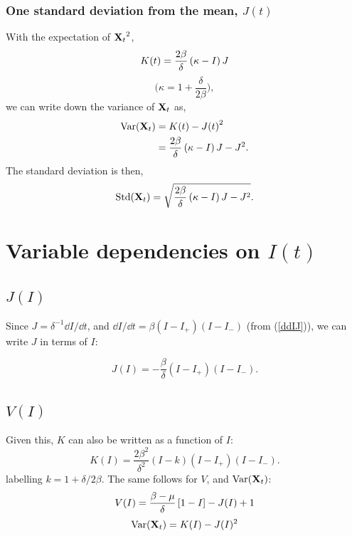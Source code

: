 \subsubsection{One standard deviation from the mean, $J(t)$}
With the expectation of ${{\bf X}_t}^2$,
\begin{equation*}
K(t) = \frac{2\beta}{\delta}\left(\kappa- I\right) J
\end{equation*}
$$\bigg( \kappa = 1+\frac{\delta}{2\beta}\bigg),$$
we can write down the variance of ${{\bf X}_t}$ as,
\begin{align*}
\text{Var}({{\bf X}_t}) &= K(t) - {J(t)}^2\\
&= \frac{2\beta}{\delta}\left(\kappa - I\right) J - J^2.
\end{align*}
The standard deviation is then,
\begin{equation*}
\text{Std}({{\bf X}_t}) = \sqrt{\frac{2\beta}{\delta}\left(\kappa- I\right) J - J^2}.
\end{equation*}
























\section{Variable dependencies on $I(t)$}


\subsection{$J(I)$}

Since $J = \delta^{-1}{\dd I}/{\dd t} $, and ${\dd I}/{\dd t} =  \beta (I - I_+)(I-I_-)$ (from (\ref{ddIJ})), we can write $J$ in terms of $I$:

\begin{equation*}
J(I) = -\frac{\beta}{\delta}  (I - I_+)(I-I_-).
\end{equation*}


\subsection{$V(I)$}


Given this, $K$ can also be written as a function of $I$:
\begin{equation*}
K(I) = \frac{2\beta^2}{\delta^2}(I-k)(I - I_+)(I-I_-).
\end{equation*}
labelling $k = 1+ \delta/2\beta$. The same follows for $V$, and $\text{Var}({{\bf X}_t})$:
\begin{equation*}
V(I) = \frac{\beta - \mu}{\delta}\left[1-I\right] - J(I) + 1
\end{equation*}
\begin{equation*}
\text{Var}({{\bf X}_t}) = K(I) - J(I)^2
\end{equation*}




